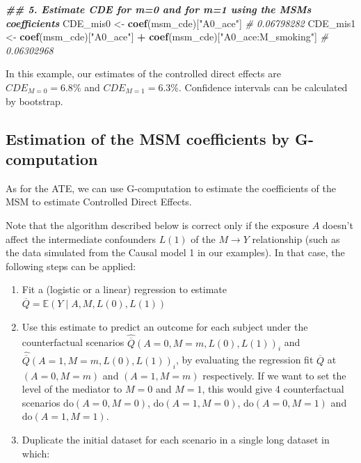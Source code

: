 \documentclass[
]{book}
\newenvironment{Shaded}{\begin{snugshade}}{\end{snugshade}}
\newcommand{\CommentTok}[1]{\textcolor[rgb]{0.56,0.35,0.01}{\textit{#1}}}
\newcommand{\DocumentationTok}[1]{\textcolor[rgb]{0.56,0.35,0.01}{\textbf{\textit{#1}}}}
\newcommand{\FunctionTok}[1]{\textcolor[rgb]{0.13,0.29,0.53}{\textbf{#1}}}
\newcommand{\NormalTok}[1]{#1}
\newcommand{\OtherTok}[1]{\textcolor[rgb]{0.56,0.35,0.01}{#1}}
\newcommand{\SpecialCharTok}[1]{\textcolor[rgb]{0.81,0.36,0.00}{\textbf{#1}}}
\newcommand{\StringTok}[1]{\textcolor[rgb]{0.31,0.60,0.02}{#1}}
\begin{document}
\begin{Shaded}
\begin{Highlighting}[]
\DocumentationTok{\#\# 5. Estimate CDE for m=0 and for m=1 using the MSM\textquotesingle{}s coefficients}
\NormalTok{CDE\_mis0 }\OtherTok{\textless{}{-}} \FunctionTok{coef}\NormalTok{(msm\_cde)[}\StringTok{"A0\_ace"}\NormalTok{]}
\CommentTok{\# 0.06798282}
\NormalTok{CDE\_mis1 }\OtherTok{\textless{}{-}} \FunctionTok{coef}\NormalTok{(msm\_cde)[}\StringTok{"A0\_ace"}\NormalTok{] }\SpecialCharTok{+} \FunctionTok{coef}\NormalTok{(msm\_cde)[}\StringTok{"A0\_ace:M\_smoking"}\NormalTok{]}
\CommentTok{\# 0.06302968}
\end{Highlighting}
\end{Shaded}

In this example, our estimates of the controlled direct effects are \(CDE_{M=0} = 6.8\%\) and \(CDE_{M=1} = 6.3\%\). Confidence intervals can be calculated by bootstrap.

\subsection{Estimation of the MSM coefficients by G-computation}\label{estimation-of-the-msm-coefficients-by-g-computation}

As for the ATE, we can use G-computation to estimate the coefficients of the MSM to estimate Controlled Direct Effects.

Note that the algorithm described below is correct only if the exposure \(A\) doesn't affect the intermediate confounders \(L(1)\) of the \(M \rightarrow Y\) relationship (such as the data simulated from the Causal model 1 in our examples). In that case, the following steps can be applied:

\begin{enumerate}
\def\labelenumi{\arabic{enumi}.}
\item
  Fit a (logistic or a linear) regression to estimate \(\overline{Q} = \mathbb{E}(Y \mid A,M, L(0),L(1))\)
\item
  Use this estimate to predict an outcome for each subject under the counterfactual scenarios \(\hat{\overline{Q}}(A=0,M=m,L(0),L(1))_i\) and \(\hat{\overline{Q}}(A=1,M=m,L(0),L(1))_i\), by evaluating the regression fit \(\overline{Q}\) at \((A=0,M=m)\) and \((A=1,M=m)\) respectively. If we want to set the level of the mediator to \(M=0\) and \(M=1\), this would give 4 counterfactual scenarios \(\text{do}(A=0,M=0)\), \(\text{do}(A=1,M=0)\), \(\text{do}(A=0,M=1)\) and \(\text{do}(A=1,M=1)\).
\item
  Duplicate the initial dataset for each scenario in a single long dataset in which:
\end{enumerate}
\end{document}
